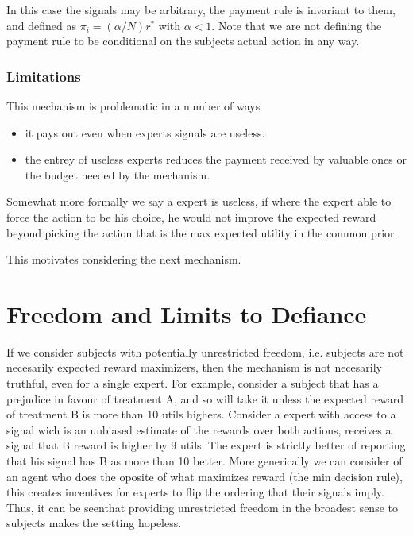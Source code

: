 In this case the signals may be arbitrary, the payment rule is invariant to them, and defined as $\pi_i  = (\alpha / N ) r^{*} $ with $\alpha < 1$. Note that we are not defining the payment rule to be conditional on the subjects actual action in any way. %


\subsubsection{Limitations}
This mechanism is problematic in a number of ways

\begin{itemize}
\item it pays out even when experts signals are useless.
\item the entrey of useless experts reduces the payment received by valuable ones or the budget needed by the mechanism.
\end{itemize}

Somewhat more formally we say a expert is useless, if where the expert able to force the action to be his choice, he would not improve the expected reward beyond picking the action that is the max expected utility in the common prior.

This motivates considering the next mechanism.


\section{Freedom and Limits to Defiance}

If we consider subjects with potentially unrestricted freedom, i.e. subjects are not necesarily expected reward maximizers, then the mechanism is not necesarily truthful, even for a single expert. For example, consider a subject that has a prejudice in favour of treatment A, and so will take it unless the expected reward of treatment B is more than 10 utils highers. Consider a expert with access to a signal wich is an unbiased estimate of the rewards over both actions, receives a signal  that B reward is higher by 9 utils. The expert is strictly better of reporting that his signal has B as more than 10 better.
More generically we can consider of an agent who does the oposite of what maximizes reward (the min decision rule), this creates incentives for experts to flip the ordering that their signals imply. Thus, it can be seenthat providing unrestricted freedom in the broadest sense to subjects makes the setting hopeless. 

